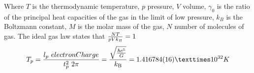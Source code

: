 \begin{multicols}{2}
Where $T$ is the thermodynamic temperature, $p$ pressure, $V$ volume,
$γ_0$ is the ratio of the principal heat capacities of the gas in the limit of low pressure,
$k_B$ is the Boltzmann constant,
$M$ is the molar mass of the gas, 
$N$ number of molecules of gas.
The ideal gas law states that ${N T \over p V k_B}=1$
$$T_p= {l_p~electronCharge \over  t_p^{2}~2\pi }={\sqrt { {\hbar c^{5}\over G}} \over k_{\text{B}}}=1.416784(16)×10^{32}K$$




\end{multicols}

